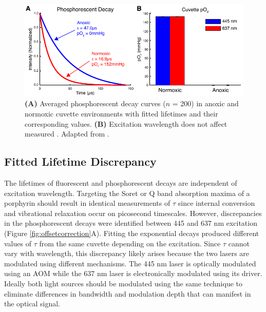 \begin{figure}
    \includegraphics{figures/chapter_2/cuvette.pdf}
    \caption[Averaged phosphorescent decay curves in anoxic and normoxic cuvette environments with fitted lifetimes and their corresponding  values.]{
        \label{fig:cuvette}
        \textbf{(A)} Averaged phosphorescent decay curves ($n$ = 200) in anoxic and normoxic cuvette environments with fitted lifetimes and their corresponding  values. \textbf{(B)} Excitation wavelength does not affect measured . Adapted from \cite{Sullender:2018ff}.
    }
\end{figure}

\subsection{Fitted Lifetime Discrepancy}

The lifetimes of fluorescent and phosphorescent decays are independent of excitation wavelength. Targeting the Soret or Q band absorption maxima of a porphyrin should result in identical measurements of $\tau$ since internal conversion and vibrational relaxation occur on picosecond timescales. However, discrepancies in the phosphorescent decays were identified between 445 and 637 nm excitation (Figure \ref{fig:offsetcorrection}A). Fitting the exponential decays produced different values of $\tau$ from the same cuvette depending on the excitation. Since $\tau$ cannot vary with wavelength, this discrepancy likely arises because the two lasers are modulated using different mechanisms. The 445 nm laser is optically modulated using an AOM while the 637 nm laser is electronically modulated using its driver. Ideally both light sources should be modulated using the same technique to eliminate differences in bandwidth and modulation depth that can manifest in the optical signal.

